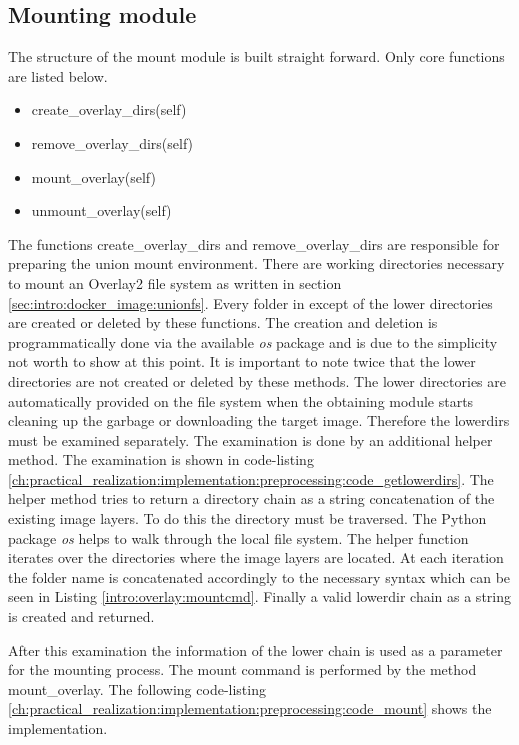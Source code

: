 \subsection{Mounting module}	
\label{ch:practical_realization:implementation:mount}
The structure of the mount module is built straight forward. Only core functions are listed below.
\begin{itemize}
\item create\_overlay\_dirs(self)
\item remove\_overlay\_dirs(self)
\item mount\_overlay(self)
\item unmount\_overlay(self)
\end{itemize}
The functions create\_overlay\_dirs and remove\_overlay\_dirs are responsible for preparing the union mount environment. 
There are working directories necessary to mount an Overlay2 file system as written in section \ref{sec:intro:docker_image:unionfs}.
Every folder in except of the lower directories are created or deleted by these functions. 
The creation and deletion is programmatically done via the available \textit{os} package and is due to the simplicity not worth to show at this point. 
It is important to note twice that the lower directories are not created or deleted by these methods. 
The lower directories are automatically provided on the file system when the obtaining module starts cleaning up the garbage or downloading the target image.
Therefore the lowerdirs must be examined separately. The examination is done by an additional helper method. 
The examination is shown in code-listing \ref{ch:practical_realization:implementation:preprocessing:code_getlowerdirs}.
The helper method tries to return a directory chain as a string concatenation of the existing image layers.
To do this the directory must be traversed. 
The Python package \textit{os} helps to walk through the local file system. 
The helper function iterates over the directories where the image layers are located.
At each iteration the folder name is concatenated accordingly to the necessary syntax which can be seen in Listing \ref{intro:overlay:mountcmd}. 
Finally a valid lowerdir chain as a string is created and returned.

After this examination the information of the lower chain is used as a parameter for the mounting process.
The mount command is performed by the method  mount\_overlay. The following code-listing \ref{ch:practical_realization:implementation:preprocessing:code_mount} shows the implementation.

